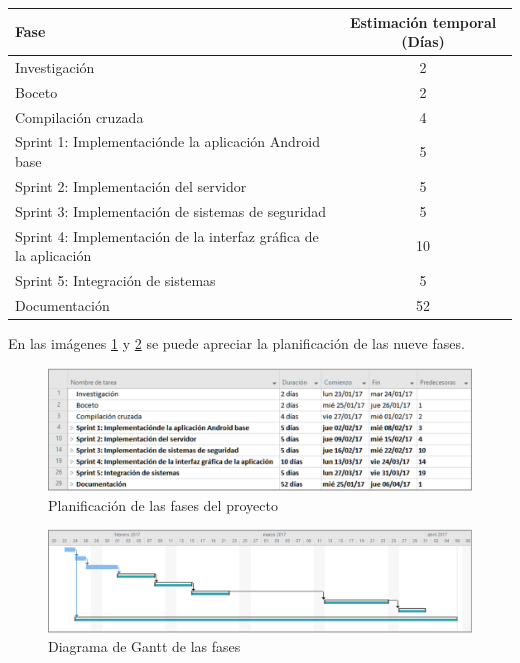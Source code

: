 \documentclass[12pt]{article}
\begin{document}
        \begin{tabular}{|l|c|}
            \hline
            \textbf{Fase}  & \textbf{Estimación temporal} (Días) \\           
            \hline
            Investigación                                                       &   2    \\
            Boceto                                                              &   2    \\
            Compilación cruzada                                                 &   4    \\
            Sprint 1: Implementaciónde la aplicación Android base               &   5    \\
            Sprint 2: Implementación del servidor                               &   5    \\
            Sprint 3: Implementación de sistemas de seguridad                   &   5    \\
            Sprint 4: Implementación de la interfaz gráfica de la aplicación    &   10   \\
            Sprint 5: Integración de sistemas                                   &   5    \\
            Documentación                                                       &   52   \\
            \hline
        \end{tabular}

        En las imágenes \ref{fig:fases} y \ref{fig:fases_gantt} se puede apreciar la planificación de las nueve fases.

        \begin{figure}[h!]
            \centering
                \includegraphics[scale=0.7]{fases.eps}
                \caption{Planificación de las fases del proyecto}
                \label{fig:fases}
        \end{figure}

        \begin{figure}[h!]
            \centering
                \includegraphics[scale=0.7]{fases_gantt.eps}
                \caption{Diagrama de Gantt de las fases}
                \label{fig:fases_gantt}
        \end{figure}
\end{document}
